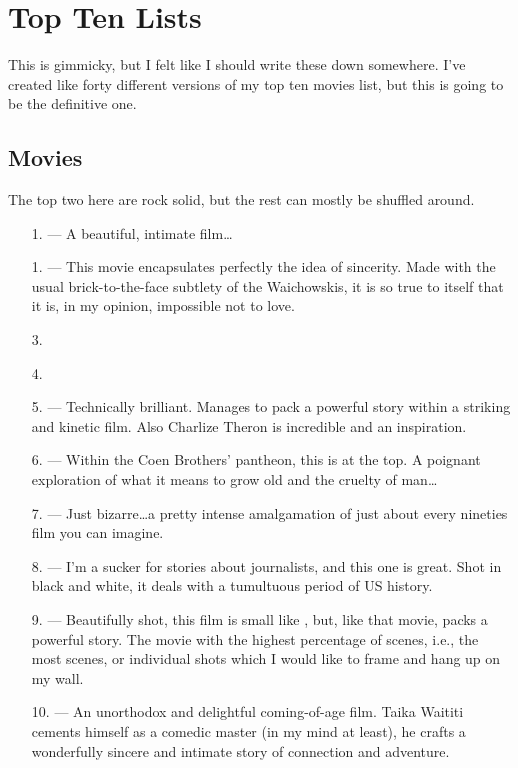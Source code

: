 \documentclass[../butidigress.tex]{subfiles}
\begin{document}
\chapter{Top Ten Lists}\label{chap:topten}
\newpage

This is gimmicky, but I felt like I should write these down somewhere.
I've created like forty different versions of my top ten movies list, but this is going to be the definitive one.

\section{Movies}\label{sec:moviestopten}
The top two here are rock solid, but the rest can mostly be shuffled around.

\begin{itemize}
    \item[1.] \textbf{} --- A beautiful, intimate film\ldots{}
    \item[1.] \textbf{} --- This movie encapsulates perfectly the idea of sincerity. Made with the usual brick-to-the-face subtlety of the Waichowskis, it is so true to itself that it is, in my opinion, impossible not to love.
    \item[3.]
    \item[4.] \textbf{}
    \item[5.] \textbf{} --- Technically brilliant. Manages to pack a powerful story within a striking and kinetic film. Also Charlize Theron is incredible and an inspiration.
    \item[6.] \textbf{} --- Within the Coen Brothers' pantheon, this is at the top. A poignant exploration of what it means to grow old and the cruelty of man\ldots
    \item[7.] \textbf{} --- Just bizarre\ldots a pretty intense amalgamation of just about every nineties film you can imagine.
    \item[8.] \textbf{} --- I'm a sucker for stories about journalists, and this one is great. Shot in black and white, it deals with a tumultuous period of US history.
    \item[9.] \textbf{} --- Beautifully shot, this film is small like , but, like that movie, packs a powerful story. The movie with the highest percentage of  scenes, i.e., the most scenes, or individual shots which I would like to frame and hang up on my wall.
    \item[10.] \textbf{} --- An unorthodox and delightful coming-of-age film. Taika Waititi cements himself as a comedic master (in my mind at least), he crafts a wonderfully sincere and intimate story of connection and adventure.
\end{itemize}
\end{document}
